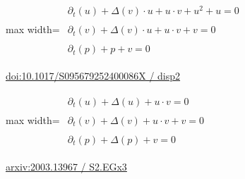 \documentclass[UTF8,10pt,a4paper,fontset=mac]{ctexart}
\begin{document}
\begin{minipage}{\linewidth}\begin{center}\begin{adjustbox}{max width=\linewidth}$\displaystyle\begin{gathered}\begin{gathered}\partial_{t}(u)+\Delta(v)\cdot u+u\cdot v+u^{2}+u=0\end{gathered}\\[5pt]\begin{gathered}\partial_{t}(v)+\Delta(v)\cdot u+u\cdot v+v=0\end{gathered}\\[5pt]\begin{gathered}\partial_{t}(p)+p+v=0\end{gathered}\end{gathered}$\end{adjustbox}\end{center}{\small\href{https://www.cambridge.org/core/journals/european-journal-of-applied-mathematics/article/spatiotemporal-behaviour-of-sir-models-with-crossdiffusion-and-vital-dynamics/F33014FE3C7FC7F75F5608E66030C421#disp2}{doi:10.1017/S095679252400086X / disp2}}\par\end{minipage}\par\vspace{6mm}

\begin{minipage}{\linewidth}\begin{center}\begin{adjustbox}{max width=\linewidth}$\displaystyle\begin{gathered}\begin{gathered}\partial_{t}(u)+\Delta(u)+u\cdot v=0\end{gathered}\\[5pt]\begin{gathered}\partial_{t}(v)+\Delta(v)+u\cdot v+v=0\end{gathered}\\[5pt]\begin{gathered}\partial_{t}(p)+\Delta(p)+v=0\end{gathered}\end{gathered}$\end{adjustbox}\end{center}{\small\href{https://arxiv.org/html/2003.13967#S2.EGx3}{arxiv:2003.13967 / S2.EGx3}}\par\end{minipage}\par\vspace{6mm}
\end{document}
